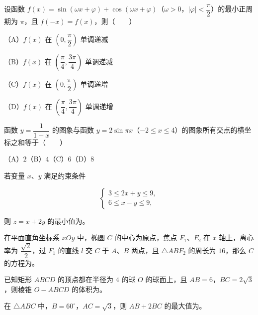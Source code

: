 \begin{question}
设函数 $f(x)=\sin(\omega x+\varphi)+\cos(\omega x+\varphi)$（$\omega>0$，$|\varphi|<\dfrac\pi2$）的最小正周期为 $\pi$，且 $f(-x)=f(x)$，则\mbox{（　　）}

（A）$f(x)$ 在 $\left(0,\dfrac\pi2\right)$ 单调递减

（B）$f(x)$ 在 $\left(\dfrac\pi4,\dfrac{3\pi}4\right)$ 单调递减

（C）$f(x)$ 在 $\left(0,\dfrac\pi2\right)$ 单调递增

（D）$f(x)$ 在 $\left(\dfrac\pi4,\dfrac{3\pi}4\right)$ 单调递增

\end{question}
\begin{question}
函数 $y=\dfrac1{1-x}$ 的图象与函数 $y=2\sin\pi x$（$-2\leq x\leq4$）的图象所有交点的横坐标之和等于\mbox{（　　）}

（A）$2$\quad（B）$4$\quad（C）$6$\quad（D）$8$

\end{question}

\begin{question}
若变量 $x\text{、}y$ 满足约束条件

\nopagebreak[4]
\[
\begin{cases}
3\leq2x+y\leq9,\\
6\leq x-y\leq9,
\end{cases}
\]

则 $z=x+2y$ 的最小值为\gkblank{}。

\end{question}
\begin{question}
在平面直角坐标系 $xOy$ 中，椭圆 $C$ 的中心为原点，焦点 $F_1\text{、}F_2$ 在 $x$ 轴上，离心率为 $\dfrac{\sqrt2}{2}$，过 $F_1$ 的直线 $l$ 交 $C$ 于 $A\text{、}B$ 两点，且 $\triangle ABF_2$ 的周长为 $16$，那么 $C$ 的方程为\gkblank{}。

\end{question}
\begin{question}
已知矩形 $ABCD$ 的顶点都在半径为 $4$ 的球 $O$ 的球面上，且 $AB=6$，$BC=2\sqrt3$，则棱锥 $O-ABCD$ 的体积为\gkblank{}。

\end{question}
\begin{question}
在 $\triangle ABC$ 中，$B=60^\circ$，$AC=\sqrt3$，则 $AB+2BC$ 的最大值为\gkblank{}。

\end{question}

